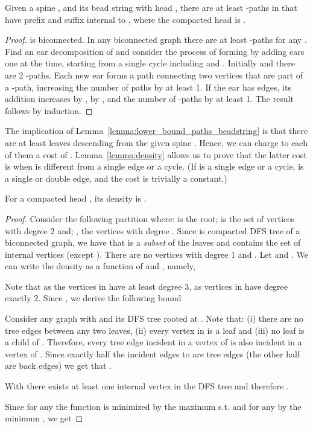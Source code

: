 \begin{lemma}
  \label{lemma:lower_bound_paths_beadstring}
  Given a spine , and its bead string  with head
  , there are at least  -paths in 
  that have prefix  and suffix 
  internal to , where the compacted head is .
\end{lemma}
\begin{proof}
    is biconnected. In any biconnected graph 
   there are at least  -paths for any . Find an ear decomposition \cite{Diestel} of  and consider
   the process of forming  by adding ears one at the time, starting
   from a single cycle including  and . Initially 
    and there are 2 -paths. Each new ear forms a path
   connecting two vertices that are part of a -path, increasing
   the number of paths by at least 1. If the ear has  edges, its
   addition increases  by ,  by , and the number of
   -paths by at least 1. The result follows by induction.
\end{proof}

The implication of Lemma~\ref{lemma:lower_bound_paths_beadstring} is
that there are at least  leaves descending from the
given spine . Hence, we can charge to each of them a cost of
. Lemma~\ref{lemma:density} allows us to prove that the latter
cost is  when  is different from a single edge or a
cycle. (If  is a single edge or a cycle,  is a
  single or double edge, and the cost is trivially a constant.)
\begin{lemma}
  \label{lemma:density}
  For a compacted head , its density is
  .
\end{lemma}
\begin{proof}
	Consider the following partition  where:  is the root;  is the set of vertices with
	degree 2 and; , the vertices with degree .  Since
	 is compacted DFS tree of a biconnected graph, we have
	that  is a \emph{subset} of the leaves and  contains
	the set of internal vertices (except ). There are no vertices
	with degree 1 and . Let  and .  We can write the
	density as a function of  and , namely,
	

	Note that  as the vertices in 
	have at least degree 3,  as vertices in
	 have degree exactly 2. Since , we derive the
	following bound
	

	Consider any graph with  and its DFS tree rooted at
        . Note that: (i) there are no tree edges between any two
        leaves, (ii) every vertex in  is a leaf and (iii) no leaf
        is a child of .  Therefore, every tree edge incident in a
        vertex of  is also incident in a vertex of . Since
        exactly half the incident edges to  are tree edges (the
        other half are back edges) we get that .

	With  there exists at least one internal vertex in
	the DFS tree and therefore .
 

 Since for any  the function is minimized by the maximum  s.t.
  and for any  by the minimum , we get
  
\end{proof}


